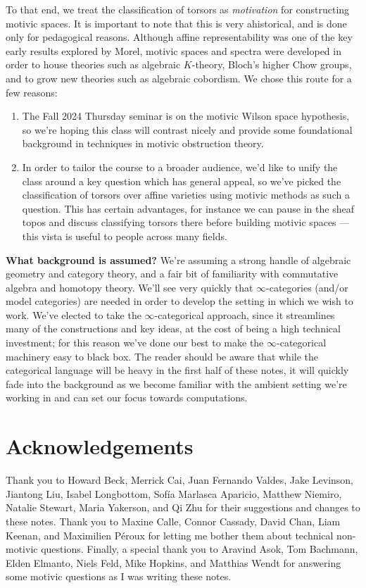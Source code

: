\documentclass[11pt,openany]{book}
\begin{document}
To that end, we treat the classification of torsors as \textit{motivation} for constructing motivic spaces. It is important to note that this is very ahistorical, and is done only for pedagogical reasons. Although affine representability was one of the key early results explored by Morel, motivic spaces and spectra were developed in order to house theories such as algebraic $K$-theory, Bloch's higher Chow groups, and to grow new theories such as algebraic cobordism. We chose this route for a few reasons:
\begin{enumerate}
    \item The Fall 2024 Thursday seminar is on the motivic Wilson space hypothesis, so we're hoping this class will contrast nicely and provide some foundational background in techniques in motivic obstruction theory.
    \item In order to tailor the course to a broader audience, we'd like to unify the class around a key question which has general appeal, so we've picked the classification of torsors over affine varieties using motivic methods as such a question. This has certain advantages, for instance we can pause in the sheaf topos and discuss classifying torsors there before building motivic spaces --- this vista is useful to people across many fields.
\end{enumerate}

\textbf{What background is assumed?} We're assuming a strong handle of algebraic geometry and category theory, and a fair bit of familiarity with commutative algebra and homotopy theory. We'll see very quickly that $\infty$-categories (and/or model categories) are needed in order to develop the setting in which we wish to work. We've elected to take the $\infty$-categorical approach, since it streamlines many of the constructions and key ideas, at the cost of being a high technical investment; for this reason we've done our best to make the $\infty$-categorical machinery easy to black box. The reader should be aware that while the categorical language will be heavy in the first half of these notes, it will quickly fade into the background as we become familiar with the ambient setting we're working in and can set our focus towards computations.




\section*{Acknowledgements}

Thank you to Howard Beck, Merrick Cai, Juan Fernando Valdes, Jake Levinson, Jiantong Liu, Isabel Longbottom, Sof\'ia Marlasca Aparicio, Matthew Niemiro, Natalie Stewart, Maria Yakerson, and Qi Zhu for their suggestions and changes to these notes. Thank you to Maxine Calle, Connor Cassady, David Chan, Liam Keenan, and Maximilien P\'eroux for letting me bother them about technical non-motivic questions. Finally, a special thank you to Aravind Asok, Tom Bachmann, Elden Elmanto, Niels Feld, Mike Hopkins, and Matthias Wendt for answering some motivic questions as I was writing these notes.
\end{document}
